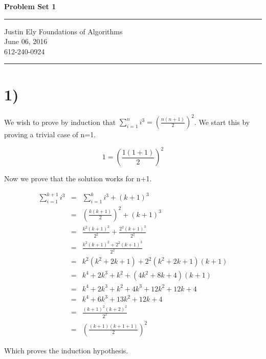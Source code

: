 \documentclass[a4paper,11pt]{article}
\begin{document}
\begin{flushright}

\vspace{1.1cm}

{\bf\Huge Problem Set 1}

\rule{0.25\linewidth}{0.5pt}

\vspace{0.5cm}
Justin Ely
\linebreak
\newline
\footnotesize{Foundations of Algorithms \\}
June 06, 2016 \\
612-240-0924
\end{flushright}

\noindent\rule{\linewidth}{1.0pt}


\section*{1)}
We wish to prove by induction that $\sum_{i=1}^n i^3 = (\frac{n(n+1)}{2})^2$.  We start this by proving a trivial case of n=1.

\begin{equation}
1 = (\frac{1(1 + 1)}{2})^2 
\end{equation}

Now we prove that the solution works for n+1.  

\begin{eqnarray}
\sum_{i = 1}^{k+1} i^3 &=& \sum_{i=1}^k i^3 + (k+1)^3 \\
&=&(\frac{k (k+1)}{2})^2 + (k+1)^3 \\
&=& \frac{k^2 (k+1)^2}{2^2} + \frac{2^2 (k+1)^3}{2^2} \\
&=& \frac{k^2 (k+1)^2 + 2^2 (k+1)^3}{2^2} \\
&=& k^2(k^2 + 2k + 1) + 2^2(k^2 + 2k + 1)(k+1) \\
&=& k^4 + 2k^3 + k^2 + (4k^2 + 8k + 4)(k+1) \\
&=& k^4 + 2k^3 + k^2 + 4k^3 + 12k^2 + 12k + 4 \\
&=& k^4 + 6k^3 + 13k^2 + 12k + 4 \\
&=& \frac{(k + 1)^2 (k+2)^2}{2^2} \\
&=& (\frac{(k + 1) (k + 1 + 1)}{2})^2
\end{eqnarray}

Which proves the induction hypothesis. \\
\end{document}
